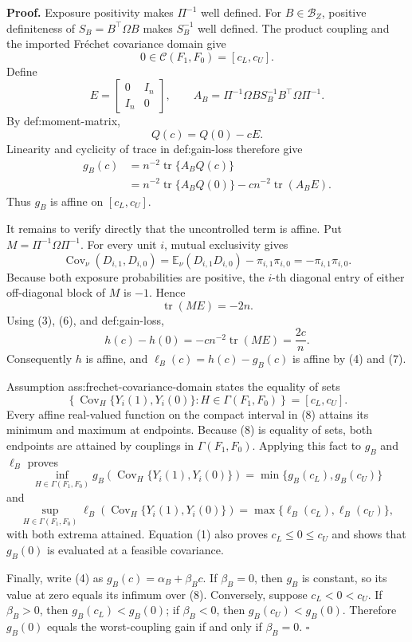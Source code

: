 \textbf{Proof.}
Exposure positivity makes \(\Pi^{-1}\) well defined.  For \(B\in\mathcal B_Z\), positive definiteness of \(S_B=B^{\top}\Omega B\) makes \(S_B^{-1}\) well defined.  The product coupling and the imported Fr\'echet covariance domain give
\[
0\in\mathcal C(F_1,F_0)=[c_L,c_U].
\tag{1}
\]
Define
\[
E=\begin{bmatrix}0&I_n\\ I_n&0\end{bmatrix},
\qquad
A_B=\Pi^{-1}\Omega B S_B^{-1}B^{\top}\Omega\Pi^{-1}.
\tag{2}
\]
By def:moment-matrix,
\[
Q(c)=Q(0)-cE.
\tag{3}
\]
Linearity and cyclicity of trace in def:gain-loss therefore give
\[
\begin{aligned}
g_B(c)
&=n^{-2}\operatorname{tr}\{A_BQ(c)\}\\
&=n^{-2}\operatorname{tr}\{A_BQ(0)\}
-c n^{-2}\operatorname{tr}(A_BE).
\end{aligned}
\tag{4}
\]
Thus \(g_B\) is affine on \([c_L,c_U]\).

It remains to verify directly that the uncontrolled term is affine.  Put \(M=\Pi^{-1}\Omega\Pi^{-1}\).  For every unit \(i\), mutual exclusivity gives
\[
\operatorname{Cov}_{\nu}(D_{i,1},D_{i,0})
=\mathbb E_{\nu}(D_{i,1}D_{i,0})-\pi_{i,1}\pi_{i,0}
=-\pi_{i,1}\pi_{i,0}.
\tag{5}
\]
Because both exposure probabilities are positive, the \(i\)-th diagonal entry of either off-diagonal block of \(M\) is \(-1\).  Hence
\[
\operatorname{tr}(ME)=-2n.
\tag{6}
\]
Using (3), (6), and def:gain-loss,
\[
h(c)-h(0)
=-c n^{-2}\operatorname{tr}(ME)
=\frac{2c}{n}.
\tag{7}
\]
Consequently \(h\) is affine, and \(\ell_B(c)=h(c)-g_B(c)\) is affine by (4) and (7).

Assumption ass:frechet-covariance-domain states the equality of sets
\[
\left\{\operatorname{Cov}_H\{Y_i(1),Y_i(0)\}:
H\in\Gamma(F_1,F_0)\right\}=[c_L,c_U].
\tag{8}
\]
Every affine real-valued function on the compact interval in (8) attains its minimum and maximum at endpoints.  Because (8) is equality of sets, both endpoints are attained by couplings in \(\Gamma(F_1,F_0)\).  Applying this fact to \(g_B\) and \(\ell_B\) proves
\[
\inf_{H\in\Gamma(F_1,F_0)}
g_B\!\left(\operatorname{Cov}_H\{Y_i(1),Y_i(0)\}\right)
=\min\{g_B(c_L),g_B(c_U)\}
\tag{9}
\]
and
\[
\sup_{H\in\Gamma(F_1,F_0)}
\ell_B\!\left(\operatorname{Cov}_H\{Y_i(1),Y_i(0)\}\right)
=\max\{\ell_B(c_L),\ell_B(c_U)\},
\tag{10}
\]
with both extrema attained.  Equation (1) also proves \(c_L\le0\le c_U\) and shows that \(g_B(0)\) is evaluated at a feasible covariance.

Finally, write (4) as \(g_B(c)=\alpha_B+\beta_Bc\).  If \(\beta_B=0\), then \(g_B\) is constant, so its value at zero equals its infimum over (8).  Conversely, suppose \(c_L<0<c_U\).  If \(\beta_B>0\), then \(g_B(c_L)<g_B(0)\); if \(\beta_B<0\), then \(g_B(c_U)<g_B(0)\).  Therefore \(g_B(0)\) equals the worst-coupling gain if and only if \(\beta_B=0\).  \(\square\)